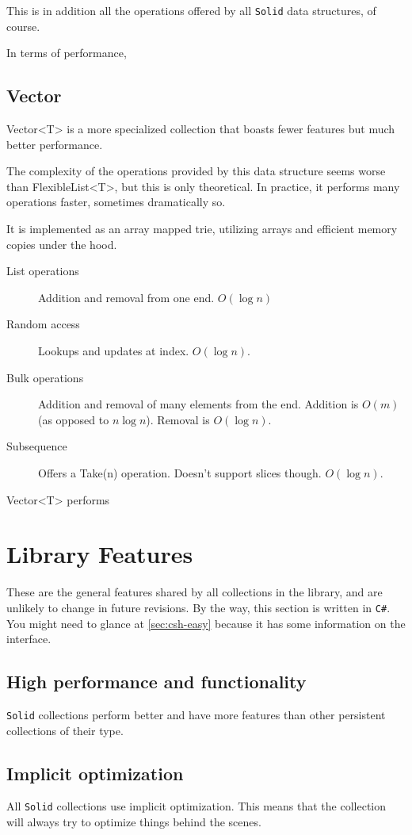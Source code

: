 \documentclass[]{article}
\newcommand{\codeformat}{\ttfamily}
\newcommand{\methodformat}{\codeformat\color{MidnightBlue}}
\newcommand{\classformat}{\codeformat\color{olive}}
\newcommand{\class}[1]{{\classformat #1}}
\newcommand{\method}[1]{{\methodformat #1}}
\newcommand{\solid}{\texttt{Solid}\xspace}
\newcommand{\csh}{\texttt{C\#}\xspace}
\begin{document}
This is in addition all the operations offered by all \solid data structures, of course. 

In terms of performance, 

\subsection{Ve\relax ctor}\label{sec:vector}
Vector<T> is a more specialized collection that boasts fewer features but much better performance. 

The complexity of the operations provided by this data structure seems worse than FlexibleList<T>, but this is only theoretical. In practice, it performs many operations faster, sometimes dramatically so.

It is implemented as an array mapped trie, utilizing arrays and efficient memory copies under the hood. 
\begin{description}
	\item[List operations] Addition and removal from one end. $O(\log n)$
	\item[Random access] Lookups and updates at index. $O(\log n)$.
	\item[Bulk operations] Addition and removal of many elements from the end. Addition is $O(m)$ (as opposed to $n \log n$). Removal is $O(\log n)$.
	\item[Subsequence] Offers a \method{Take(n)} operation. Doesn't support slices though. $O(\log n)$.
\end{description}

\class{Vector<T>} performs


\section{Library Features}\label{sec:library}
These are the general features shared by all collections in the library, and are unlikely to change in future revisions. By the way, this section is written in \csh. You might need to glance at \cref{sec:csh-easy} because it has some information on the interface.

\subsection{High performance and functionality}
\solid collections perform better and have more features than other persistent collections of their type. 

\subsection{Implicit optimization}\label{sec:optimization}
All \solid collections use implicit optimization. This means that the collection will always try to optimize things behind the scenes.
\end{document}
